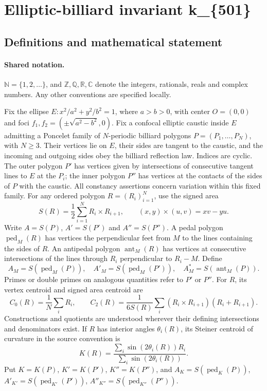 \documentclass[11pt]{article}
\begin{document}
\section{Elliptic-billiard invariant k\_\{501\}}\label{statement}

\subsection{Definitions and mathematical statement}

\paragraph{Shared notation.}$\mathbb N=\{1,2,\ldots\}$, and $\mathbb Z,\mathbb Q,\mathbb R,\mathbb C$ denote the integers, rationals, reals and complex numbers. Any other conventions are specified locally.


Fix the ellipse $E:x^2/a^2+y^2/b^2=1$, where $a>b>0$, with center $O=(0,0)$ and foci $f_1,f_2=(\pm\sqrt{a^2-b^2},0)$. Fix a confocal elliptic caustic inside $E$ admitting a Poncelet family of $N$-periodic billiard polygons $P=(P_1,\ldots,P_N)$, with $N\geq3$. Their vertices lie on $E$, their sides are tangent to the caustic, and the incoming and outgoing sides obey the billiard reflection law. Indices are cyclic. The outer polygon $P'$ has vertices given by intersections of consecutive tangent lines to $E$ at the $P_i$; the inner polygon $P''$ has vertices at the contacts of the sides of $P$ with the caustic. All constancy assertions concern variation within this fixed family.
For any ordered polygon $R=(R_i)_{i=1}^N$, use the signed area
\[S(R)=\frac12\sum_{i=1}^N R_i\times R_{i+1},\qquad (x,y)\times(u,v)=xv-yu.\]
Write $A=S(P)$, $A'=S(P')$ and $A''=S(P'')$. A pedal polygon $\operatorname{ped}_M(R)$ has vertices the perpendicular feet from $M$ to the lines containing the sides of $R$. An antipedal polygon $\operatorname{ant}_M(R)$ has vertices at consecutive intersections of the lines through $R_i$ perpendicular to $R_i-M$. Define
\[A_M=S(\operatorname{ped}_M(P)),\quad A'_M=S(\operatorname{ped}_M(P')),\quad A_M^*=S(\operatorname{ant}_M(P)).\]
Primes or double primes on analogous quantities refer to $P'$ or $P''$. For $R$, its vertex centroid and signed area centroid are
\[C_0(R)=\frac1N\sum_i R_i,\qquad C_2(R)=\frac{1}{6S(R)}\sum_i(R_i\times R_{i+1})(R_i+R_{i+1}).\]
Constructions and quotients are understood wherever their defining intersections and denominators exist.
If $R$ has interior angles $\theta_i(R)$, its Steiner centroid of curvature in the source convention is
\[K(R)=\frac{\sum_i\sin(2\theta_i(R))R_i}{\sum_i\sin(2\theta_i(R))}.\]
Put $K=K(P)$, $K'=K(P')$, $K''=K(P'')$, and $A_K=S(\operatorname{ped}_K(P))$, $A'_{K'}=S(\operatorname{ped}_{K'}(P'))$, $A''_{K''}=S(\operatorname{ped}_{K''}(P''))$.
\end{document}

